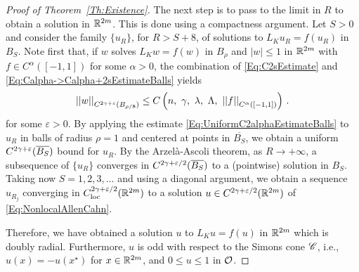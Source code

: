 \begin{proof}[Proof of Theorem~\ref{Th:Existence}]
The next step is to pass to the limit in $R$ to obtain a solution in $\mathbb{R}^{2m}$. This is done using a compactness argument. Let $S>0$ and consider the family $\{u_R\}$, for $R> S + 8$, of solutions to $L_K u_R = f(u_R)$ in $B_{S}$. Note first that, if $w$ solves $L_K w = f(w)$ in $B_\rho$ and  $|w|\leq 1$ in $\mathbb{R}^{2m}$ with $f\in C^{\alpha}([-1,1])$ for some $\alpha > 0$, the combination of \eqref{Eq:C2sEstimate} and \eqref{Eq:Calpha->Calpha+2sEstimateBalls} yields
\begin{equation}
\label{Eq:UniformC2alphaEstimateBalls}
\norm{w}_{C^{2\s + \varepsilon}(B_{\rho/8})} \leq C \bpar{n,\ \s ,\ \lambda,\ \Lambda ,\ \norm{f}_{C^{\alpha}([-1,1])} }\,.
\end{equation}
for some $\varepsilon > 0$.  By applying the estimate \eqref{Eq:UniformC2alphaEstimateBalls} to $u_R$ in balls of radius $\rho = 1$ and centered at points in $\overline{B_{S}}$, we obtain a uniform $C^{2\gamma + \varepsilon}(\overline{B_S})$ bound for $u_R$. By the Arzelà-Ascoli theorem, as $R\to +\infty$, a subsequence of $\{u_R\}$ converges in $C^{2\gamma + \varepsilon/2}(\overline{B_S})$ to a (pointwise) solution in $B_S$. Taking now $S = 1,2,3,\ldots$ and using a diagonal argument, we obtain a sequence $u_{R_j}$ converging in $C^{2\gamma + \varepsilon/2}_{\mathrm{loc}}(\mathbb{R}^{2m})$ to a solution $u \in C^{2\gamma + \varepsilon/2}(\mathbb{R}^{2m})$ of \eqref{Eq:NonlocalAllenCahn}.

Therefore, we have obtained a solution $u$ to $L_K u = f(u)$ in $\mathbb{R}^{2m}$ which is doubly radial. Furthermore, $u$ is odd with respect to the Simons cone $\mathscr{C}$, i.e., $u(x) = -u(x^\star)$ for $x\in \mathbb{R}^{2m}$, and $0 \leq u\leq 1$ in $\mathcal{O}$.


\end{proof}
